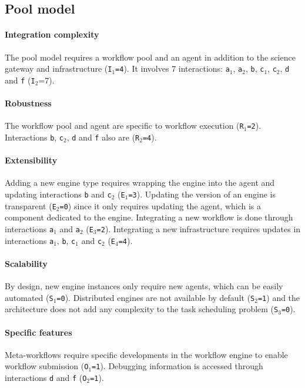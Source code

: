 \documentclass[preprint,3p,twocolumn]{elsarticle}
\begin{document}
\subsection{Pool model}

\paragraph{Integration complexity} The pool model requires a workflow pool and an
agent in addition to the science gateway and infrastructure
(\texttt{I$_1$=4}). It involves 7 interactions: \texttt{a$_1$},
\texttt{a$_2$}, \texttt{b}, \texttt{c$_1$}, \texttt{c$_2$}, \texttt{d}
and \texttt{f} (\texttt{I$_2$}=7).

\paragraph{Robustness} The workflow pool and agent are specific to
workflow execution (\texttt{R$_1$=2}). Interactions \texttt{b},
\texttt{c$_2$}, \texttt{d} and \texttt{f} also are (\texttt{R$_2$=4}).

\paragraph{Extensibility} Adding a new engine type requires wrapping
the engine into the agent and updating interactions \texttt{b} and
\texttt{c$_2$} (\texttt{E$_1$=3}). Updating the version of an engine
is transparent (\texttt{E$_2$=0}) since it only requires updating the
agent, which is a component dedicated to the engine. Integrating a new workflow is
done through interactions \texttt{a$_1$} and \texttt{a$_2$}
(\texttt{E$_3$=2}). Integrating a new infrastructure requires updates
in interactions \texttt{a$_1$}, \texttt{b}, \texttt{c$_1$} and \texttt{c$_2$}
(\texttt{E$_4$=4}).

\paragraph{Scalability} By design, new engine instances only require
new agents, which can be easily automated (\texttt{S$_1$=0}). Distributed engines are not available
by default (\texttt{S$_2$=1}) and the architecture does not add any
complexity to the task scheduling problem (\texttt{S$_3$=0}).

\paragraph{Specific features} Meta-workflows require specific
developments in the workflow engine to enable workflow submission
(\texttt{O$_1$=1}). Debugging information is accessed through
interactions \texttt{d} and \texttt{f} (\texttt{O$_2$=1}).
\end{document}
